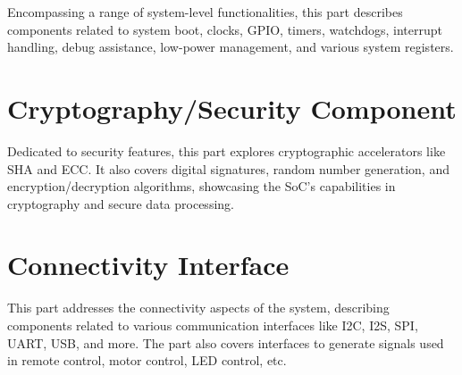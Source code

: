 \documentclass[openany, 10pt]{book}
\begin{document}

Encompassing a range of system-level functionalities, this part describes components related to system boot, clocks, GPIO, timers, watchdogs, interrupt handling, debug assistance, low-power management, and various system registers.


\part{Cryptography/Security Component}

Dedicated to security features, this part explores cryptographic accelerators like SHA and ECC. It also covers digital signatures, random number generation, and encryption/decryption algorithms, showcasing the SoC's capabilities in cryptography and secure data processing.




\part{Connectivity Interface}


This part addresses the connectivity aspects of the system, describing components related to various communication interfaces like I2C, I2S, SPI, UART, USB, and more. The part also covers interfaces to generate signals used in remote control, motor control, LED control, etc.

\end{document}
